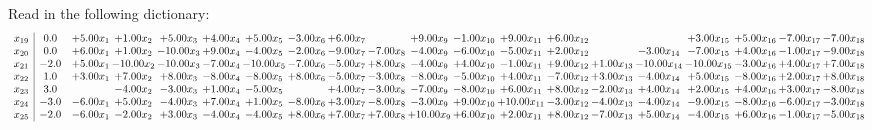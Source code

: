 \documentclass[9pt]{article}
\begin{document}
Read in the following dictionary:
\[\begin{array}{c| c c@{\hskip 2pt} c@{\hskip 2pt} c@{\hskip 2pt} c@{\hskip 2pt} c@{\hskip 2pt} c@{\hskip 2pt} c@{\hskip 2pt} c@{\hskip 2pt} c@{\hskip 2pt} c@{\hskip 2pt} c@{\hskip 2pt} c@{\hskip 2pt} c@{\hskip 2pt} c@{\hskip 2pt} c@{\hskip 2pt} c@{\hskip 2pt} c@{\hskip 2pt} c@{\hskip 2pt} }
 x_{19}   &  0.0 & +  5.00 x_{1} & +  1.00 x_{2} & +  5.00 x_{3} & +  4.00 x_{4} & +  5.00 x_{5} & -3.00 x_{6} & +  6.00 x_{7} &   & +  9.00 x_{9} & -1.00 x_{10} & +  9.00 x_{11} & +  6.00 x_{12} &    &   & +  3.00 x_{15} & +  5.00 x_{16} & -7.00 x_{17} & -7.00 x_{18}\\
 x_{20}   &  0.0 & +  6.00 x_{1} & +  1.00 x_{2} & -10.00 x_{3} & +  9.00 x_{4} & -4.00 x_{5} & -2.00 x_{6} & -9.00 x_{7} & -7.00 x_{8} & -4.00 x_{9} & -6.00 x_{10} & -5.00 x_{11} & +  2.00 x_{12} &   & -3.00 x_{14} & -7.00 x_{15} & +  4.00 x_{16} & -1.00 x_{17} & -9.00 x_{18}\\
 x_{21}   &  -2.0 & +  5.00 x_{1} & -10.00 x_{2} & -10.00 x_{3} & -7.00 x_{4} & -10.00 x_{5} & -7.00 x_{6} & -5.00 x_{7} & +  8.00 x_{8} & -4.00 x_{9} & +  4.00 x_{10} & -1.00 x_{11} & +  9.00 x_{12} & +  1.00 x_{13} & -10.00 x_{14} & -10.00 x_{15} & -3.00 x_{16} & +  4.00 x_{17} & +  7.00 x_{18}\\
 x_{22}   &  1.0 & +  3.00 x_{1} & +  7.00 x_{2} & +  8.00 x_{3} & -8.00 x_{4} & -8.00 x_{5} & +  8.00 x_{6} & -5.00 x_{7} & -3.00 x_{8} & -8.00 x_{9} & -5.00 x_{10} & +  4.00 x_{11} & -7.00 x_{12} & +  3.00 x_{13} & -4.00 x_{14} & +  5.00 x_{15} & -8.00 x_{16} & +  2.00 x_{17} & +  8.00 x_{18}\\
 x_{23}   &  3.0  &   & -4.00 x_{2} & -3.00 x_{3} & +  1.00 x_{4} & -5.00 x_{5} &   & +  4.00 x_{7} & -3.00 x_{8} & -7.00 x_{9} & -8.00 x_{10} & +  6.00 x_{11} & +  8.00 x_{12} & -2.00 x_{13} & +  4.00 x_{14} & +  2.00 x_{15} & +  4.00 x_{16} & +  3.00 x_{17} & -8.00 x_{18}\\
 x_{24}   &  -3.0 & -6.00 x_{1} & +  5.00 x_{2} & -4.00 x_{3} & +  7.00 x_{4} & +  1.00 x_{5} & -8.00 x_{6} & +  3.00 x_{7} & -8.00 x_{8} & -3.00 x_{9} & +  9.00 x_{10} & + 10.00 x_{11} & -3.00 x_{12} & -4.00 x_{13} & -4.00 x_{14} & -9.00 x_{15} & -8.00 x_{16} & -6.00 x_{17} & -3.00 x_{18}\\
 x_{25}   &  -2.0 & -6.00 x_{1} & -2.00 x_{2} & +  3.00 x_{3} & -4.00 x_{4} & -4.00 x_{5} & +  8.00 x_{6} & +  7.00 x_{7} & +  7.00 x_{8} & + 10.00 x_{9} & +  6.00 x_{10} & +  2.00 x_{11} & +  8.00 x_{12} & -7.00 x_{13} & +  5.00 x_{14} & -4.00 x_{15} & +  6.00 x_{16} & -1.00 x_{17} & -5.00 x_{18}\\

\end{array}\]
\end{document}
